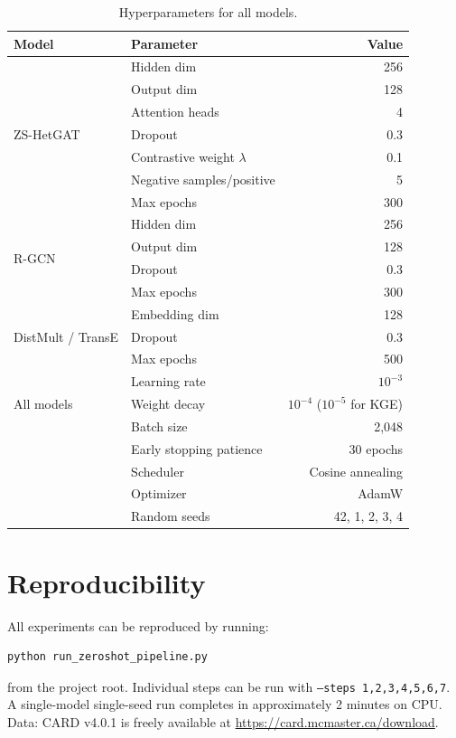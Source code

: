 \documentclass[conference]{IEEEtran}
\begin{document}
\begin{table}[h]
\centering
\caption{Hyperparameters for all models.}
\label{tab:hparams}
\begin{tabular}{llr}
\toprule
\textbf{Model} & \textbf{Parameter} & \textbf{Value} \\
\midrule
\multirow{7}{*}{ZS-HetGAT}
  & Hidden dim & 256 \\
  & Output dim & 128 \\
  & Attention heads & 4 \\
  & Dropout & 0.3 \\
  & Contrastive weight $\lambda$ & 0.1 \\
  & Negative samples/positive & 5 \\
  & Max epochs & 300 \\
\midrule
\multirow{4}{*}{R-GCN}
  & Hidden dim & 256 \\
  & Output dim & 128 \\
  & Dropout & 0.3 \\
  & Max epochs & 300 \\
\midrule
\multirow{3}{*}{DistMult / TransE}
  & Embedding dim & 128 \\
  & Dropout & 0.3 \\
  & Max epochs & 500 \\
\midrule
\multirow{3}{*}{All models}
  & Learning rate & $10^{-3}$ \\
  & Weight decay & $10^{-4}$ ($10^{-5}$ for KGE) \\
  & Batch size & 2,048 \\
  & Early stopping patience & 30 epochs \\
  & Scheduler & Cosine annealing \\
  & Optimizer & AdamW \\
  & Random seeds & 42, 1, 2, 3, 4 \\
\bottomrule
\end{tabular}
\end{table}

\section{Reproducibility}
All experiments can be reproduced by running:
\begin{verbatim}
python run_zeroshot_pipeline.py
\end{verbatim}
from the project root. Individual steps can be run with
\texttt{--steps 1,2,3,4,5,6,7}. A single-model single-seed run
completes in approximately 2 minutes on CPU.
Data: CARD v4.0.1 is freely available at
\url{https://card.mcmaster.ca/download}.
\end{document}
